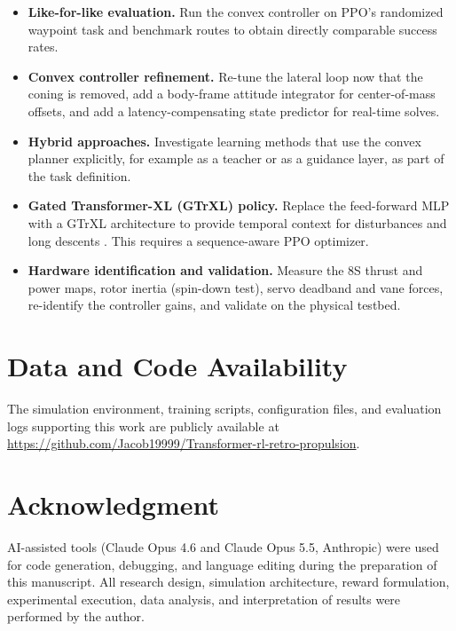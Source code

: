 \documentclass[conference]{IEEEtran}
\begin{document}
\begin{itemize}
    \item \textbf{Like-for-like evaluation.} Run the convex controller on PPO's randomized waypoint task and benchmark routes to obtain directly comparable success rates.
    \item \textbf{Convex controller refinement.} Re-tune the lateral loop now that the coning is removed, add a body-frame attitude integrator for center-of-mass offsets, and add a latency-compensating state predictor for real-time solves.
    \item \textbf{Hybrid approaches.} Investigate learning methods that use the convex planner explicitly, for example as a teacher or as a guidance layer, as part of the task definition.
    \item \textbf{Gated Transformer-XL (GTrXL) policy.} Replace the feed-forward MLP with a GTrXL architecture \cite{b16, b17} to provide temporal context for disturbances and long descents \cite{b19, b20}. This requires a sequence-aware PPO optimizer.
    \item \textbf{Hardware identification and validation.} Measure the 8S thrust and power maps, rotor inertia (spin-down test), servo deadband and vane forces, re-identify the controller gains, and validate on the physical testbed.
\end{itemize}

\section*{Data and Code Availability}

The simulation environment, training scripts, configuration files, and evaluation logs supporting this work are publicly available at \url{https://github.com/Jacob19999/Transformer-rl-retro-propulsion}.

\section*{Acknowledgment}

AI-assisted tools (Claude Opus 4.6 and Claude Opus 5.5, Anthropic) were used for code generation, debugging, and language editing during the preparation of this manuscript. All research design, simulation architecture, reward formulation, experimental execution, data analysis, and interpretation of results were performed by the author.
\end{document}
